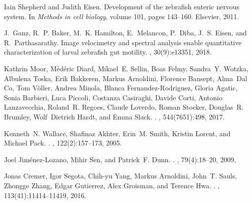 \begin{thebibliography}{10}
	Iain Shepherd and Judith Eisen.
	\newblock Development of the zebrafish enteric nervous system.
	\newblock In {\em Methods in cell biology}, volume 101, pages 143--160.
	Elsevier, 2011.
	
	J.~Ganz, R.~P. Baker, M.~K. Hamilton, E.~Melancon, P.~Diba, J.~S. Eisen, and
	R.~Parthasarathy.
	\newblock Image velocimetry and spectral analysis enable quantitative
	characterization of larval zebrafish gut motility.
	, 30(9):e13351, 2018.
	
	Kathrin Moor, M{\'{e}}d{\'{e}}ric Diard, Mikael~E. Sellin, Boas Felmy,
	Sandra~Y. Wotzka, Albulena Toska, Erik Bakkeren, Markus Arnoldini, Florence
	Bansept, Alma~Dal Co, Tom V{\"{o}}ller, Andrea Minola, Blanca
	Fernandez-Rodriguez, Gloria Agatic, Sonia Barbieri, Luca Piccoli, Costanza
	Casiraghi, Davide Corti, Antonio Lanzavecchia, Roland~R. Regoes, Claude
	Loverdo, Roman Stocker, Douglas~R. Brumley, Wolf~Dietrich Hardt, and Emma
	Slack.
	.
	, 544(7651):498, 2017.
	
	Kenneth~N. Wallace, Shafinaz Akhter, Erin~M. Smith, Kristin Lorent, and Michael
	Pack.
	.
	, 122(2):157--173, 2005.
	
	Joel Jim{\'{e}}nez-Lozano, Mihir Sen, and Patrick~F. Dunn.
	.
	, 79(4):18--20, 2009.
	
	Jonas Cremer, Igor Segota, Chih-yu Yang, Markus Arnoldini, John~T. Sauls,
	Zhongge Zhang, Edgar Gutierrez, Alex Groisman, and Terence Hwa.
	.
	,
	113(41):11414--11419, 2016.
	
\end{thebibliography}







